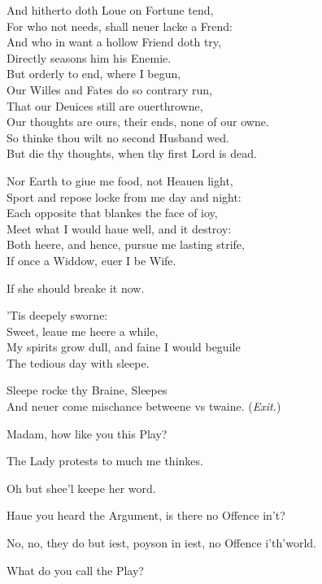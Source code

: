 \documentclass[a5paper,DIV=calc,11pt]{scrbook}
\begin{document}
\begin{drama*}
    And hitherto doth Loue on Fortune tend,\\
    For who not needs, shall neuer lacke a Frend:\\
    And who in want a hollow Friend doth try,\\
    Directly seasons him his Enemie.\\
    But orderly to end, where I begun,\\
    Our Willes and Fates do so contrary run,\\
    That our Deuices still are ouerthrowne,\\
    Our thoughts are ours, their ends, none of our owne.\\
    So thinke thou wilt no second Husband wed.\\
    But die thy thoughts, when thy first Lord is dead.
    
    \playqueen Nor Earth to giue me food, not Heauen light,\\
    Sport and repose locke from me day and night:\\
    Each opposite that blankes the face of ioy,\\
    Meet what I would haue well, and it destroy:\\
    Both heere, and hence, pursue me lasting strife,\\
    If once a Widdow, euer I be Wife.
    
    \hamspeaks If she should breake it now.
    
    \playking 'Tis deepely sworne:\\
    Sweet, leaue me heere a while,\\
    My spirits grow dull, and faine I would beguile\\
    The tedious day with sleepe.
    
    \playqueen Sleepe rocke thy Braine, Sleepes\\
    And neuer come mischance betweene vs twaine. \hfill(\textit{Exit.})
    
    \hamspeaks Madam, how like you this Play?
    
    \queenspeaks The Lady protests to much me thinkes.
    
    \hamspeaks Oh but shee'l keepe her word.
    
    \kingspeaks Haue you heard the Argument, is there no Offence in't?
    
    \hamspeaks No, no, they do but iest, poyson in iest, no Offence i'th'world.
    
    \kingspeaks What do you call the Play?
    

\end{drama*}
\end{document}
